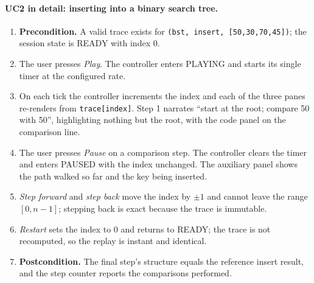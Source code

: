 \documentclass[11pt,a4paper]{article}
\newcommand{\ct}[1]{\texttt{#1}}
\begin{document}
\paragraph{UC2 in detail: inserting into a binary search tree.}
\begin{enumerate}[leftmargin=1.6em,itemsep=2pt]
  \item \textbf{Precondition.} A valid trace exists for \ct{(bst, insert, [50,30,70,45])};
        the session state is READY with index 0.
  \item The user presses \emph{Play}. The controller enters PLAYING and starts its single
        timer at the configured rate.
  \item On each tick the controller increments the index and each of the three panes
        re-renders from \ct{trace[index]}. Step 1 narrates ``start at the root; compare
        50 with 50'', highlighting nothing but the root, with the code panel on the
        comparison line.
  \item The user presses \emph{Pause} on a comparison step. The controller clears the
        timer and enters PAUSED with the index unchanged. The auxiliary panel shows the
        path walked so far and the key being inserted.
  \item \emph{Step forward} and \emph{step back} move the index by $\pm 1$ and cannot leave
        the range $[0, n-1]$; stepping back is exact because the trace is immutable.
  \item \emph{Restart} sets the index to 0 and returns to READY; the trace is not
        recomputed, so the replay is instant and identical.
  \item \textbf{Postcondition.} The final step's structure equals the reference insert
        result, and the step counter reports the comparisons performed.
\end{enumerate}
\end{document}
